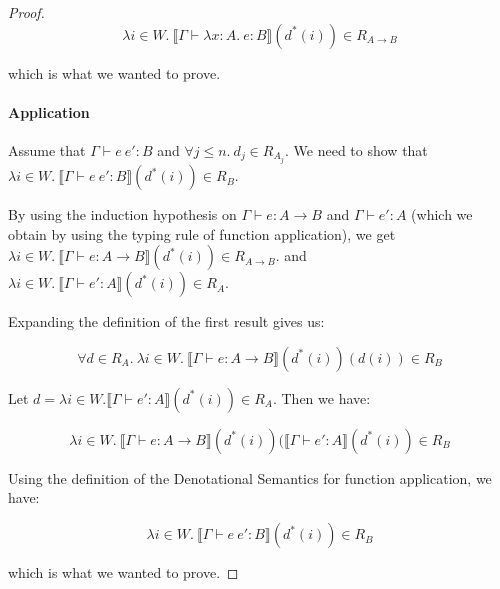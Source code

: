 \begin{proof}
\[\lambda i \in W. \  \llbracket \Gamma \vdash \lambda x : A. \ e : B \rrbracket (d^*(i)) \in R_{A \to B}\]

which is what we wanted to prove.

\paragraph{Application} Assume that $\Gamma \vdash e \ e' :  B$ and $\forall j \leq n. \ d_j \in R_{A_j}$. We need to show that $\lambda i \in W. \  \llbracket \Gamma \vdash  e \ e' : B \rrbracket (d^*(i)) \in R_B$.

By using the induction hypothesis on $\Gamma \vdash e : A \to B$ and $\Gamma \vdash e' : A$ (which we obtain by using the typing rule of function application), we get 
$\lambda i \in W. \  \llbracket \Gamma \vdash e : A \to B \rrbracket(d^*(i)) \in R_{A \to B}$. and $\lambda i \in W. \ \llbracket \Gamma \vdash e' : A \rrbracket(d^*(i)) \in R_{A}$.

Expanding the definition of the first result gives us:

\[ \forall d \in R_A. \  \lambda i \in W. \  \llbracket \Gamma \vdash e : A \to B \rrbracket(d^*(i))(d(i)) \in R_B \]

Let $d = \lambda i \in W. \llbracket \Gamma \vdash e' : A  \rrbracket(d^*(i)) \in R_A$. Then we have:

\[  \lambda i \in W. \  \llbracket \Gamma \vdash e : A \to B \rrbracket(d^*(i))( \llbracket \Gamma \vdash e' : A \rrbracket(d^*(i)) \in R_B \]
 
Using the definition of the Denotational Semantics for function application, we have:

\[\lambda i \in W. \  \llbracket \Gamma \vdash  e \ e' : B \rrbracket (d^*(i)) \in R_B\]

which is what we wanted to prove.
\end{proof}